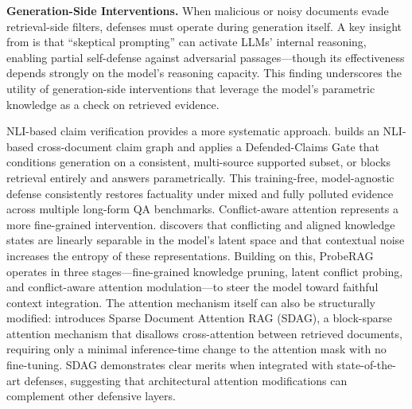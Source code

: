 \documentclass[11pt]{article}
\begin{document}
\textbf{Generation-Side Interventions.} When malicious or noisy documents evade retrieval-side filters, defenses must operate during generation itself. A key insight from \cite{ref213} is that ``skeptical prompting'' can activate LLMs' internal reasoning, enabling partial self-defense against adversarial passages---though its effectiveness depends strongly on the model's reasoning capacity. This finding underscores the utility of generation-side interventions that leverage the model's parametric knowledge as a check on retrieved evidence.

NLI-based claim verification provides a more systematic approach. \cite{ref212} builds an NLI-based cross-document claim graph and applies a Defended-Claims Gate that conditions generation on a consistent, multi-source supported subset, or blocks retrieval entirely and answers parametrically. This training-free, model-agnostic defense consistently restores factuality under mixed and fully polluted evidence across multiple long-form QA benchmarks. Conflict-aware attention represents a more fine-grained intervention. \cite{ref185} discovers that conflicting and aligned knowledge states are linearly separable in the model's latent space and that contextual noise increases the entropy of these representations. Building on this, ProbeRAG operates in three stages---fine-grained knowledge pruning, latent conflict probing, and conflict-aware attention modulation---to steer the model toward faithful context integration. The attention mechanism itself can also be structurally modified: \cite{ref449} introduces Sparse Document Attention RAG (SDAG), a block-sparse attention mechanism that disallows cross-attention between retrieved documents, requiring only a minimal inference-time change to the attention mask with no fine-tuning. SDAG demonstrates clear merits when integrated with state-of-the-art defenses, suggesting that architectural attention modifications can complement other defensive layers.
\end{document}
